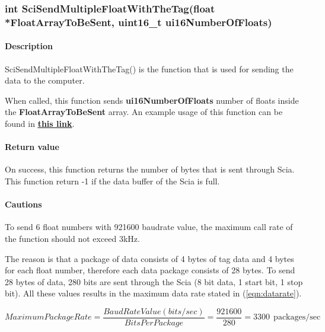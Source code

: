 \documentclass{article}
\begin{document}
\subsubsection{int SciSendMultipleFloatWithTheTag(float *FloatArrayToBeSent, uint16\_t ui16NumberOfFloats)}
\label{subsubsection:scisendmultiplefloat}
\begin{addmargin}[4em]{1em}
	\paragraph{Description}
	SciSendMultipleFloatWithTheTag() is the function that is used for sending the data to the computer. 
	
	When called, this function sends \textbf{ui16NumberOfFloats} number of floats inside the \textbf{FloatArrayToBeSent} array. An example usage of this function can be found in \href{https://github.com/hakansrc/fault_tolerant_drives/blob/master/Software/MultipleDataPlot/ExampleProject/main.c}{\underline{\textbf{this link}}}.
	\paragraph{Return value}
	On success, this function returns the number of bytes that is sent through Scia. 
	This function return -1 if the data buffer of the Scia is full.
	\paragraph{Cautions}
	To send 6 float numbers with 921600 baudrate value, the maximum call rate of the function should not exceed 3kHz. 
	
	The reason is that a package of data consists of 4 bytes of tag data and 4 bytes for each float number, therefore each data package consists of 28 bytes. To send 28 bytes of data, 280 bits are sent through the Scia (8 bit data, 1 start bit, 1 stop bit). All these values results in the maximum data rate stated in (\ref{eqn:datarate}).

	\begin{equation} \label{eqn:datarate}
		Maximum Package Rate  = \frac{Baud Rate Value(bits/sec)}{Bits Per Package} = \frac{921600}{280}= 3300  \:\: \mathrm{packages/sec}
	\end{equation}
\end{addmargin}
\end{document}
